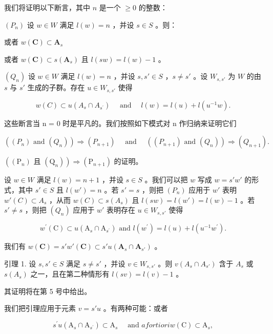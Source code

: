 我们将证明以下断言，其中 \(n\) 是一个 \(\geqslant 0\) 的整数：

\((P_n)\) 设 \(w \in W\) 满足 \(l(w) = n\) ，并设 \(s \in S\) 。则：

或者 \(w(\mathbf{C})\subset \mathbf{A}_s\)

或者 \(w(\mathbf{C}) \subset s(\mathbf{A}_s)\) 且 \(l(sw) = l(w) - 1\) 。

\((Q_n)\) 设 \(w \in W\) 满足 \(l(w) = n\) ，并设 \(s, s' \in S\) ，\(s \neq s'\) 。设 \(W_{s,s'}\) 为 \(W\) 的由 \(s\) 与 \(s'\) 生成的子群。存在 \(u \in W_{s,s'}\) 使得

\[
w (C) \subset u \left(A _ {s} \cap A _ {s ^ {\prime}}\right) \quad \text { and } \quad l (w) = l (u) + l \left(u ^ {- 1} w\right).
\]

这些断言当 n = 0 时是平凡的。我们按照如下模式对 n 作归纳来证明它们

\[
\left(\left(P _ {n}\right) \text {   and   } \left(Q _ {n}\right)\right) \Longrightarrow \left(P _ {n + 1}\right) \quad \text { and } \quad \left(\left(P _ {n + 1}\right) \text {   and   } \left(Q _ {n}\right)\right) \Longrightarrow \left(Q _ {n + 1}\right).
\]

\(\left((\mathrm{P}_n)\text{ 且 } (\mathrm{Q}_n)\right) \Longrightarrow (\mathrm{P}_{n+1})\) 的证明。

设 \(w \in W\) 满足 \(l(w) = n + 1\) ，并设 \(s \in S\) 。我们可以把 \(w\) 写成 \(w = s'w'\) 的形式，其中 \(s' \in S\) 且 \(l(w') = n\) 。若 \(s' = s\) ，则把 \((P_n)\) 应用于 \(w'\) 表明 \(w'(C) \subset A_s\) ，从而 \(w(C) \subset s(A_s)\) 且 \(l(sw) = l(w') = l(w) - 1\) 。若 \(s' \neq s\) ，则把 \((Q_n)\) 应用于 \(w'\) 表明存在 \(u \in W_{s,s'}\) 使得

\[
w ^ {\prime} (\mathrm{C}) \subset u \left(\mathrm{A} _ {s} \cap \mathrm{A} _ {s ^ {\prime}}\right) \text { and } l \left(w ^ {\prime}\right) = l (u) + l \left(u ^ {- 1} w ^ {\prime}\right).
\]

我们有 \(w(\mathbf{C}) = s'w'(\mathbf{C}) \subset s'u(\mathbf{A}_s \cap \mathbf{A}_{s'})\) 。

引理 1. 设 \(s, s' \in S\) 满足 \(s \neq s'\) ，并设 \(v \in W_{s,s'}\) 。则 \(v(A_s \cap A_{s'})\) 含于 \(A_s\) 或 \(s(A_s)\) 之一，且在第二种情形有 \(l(sv) = l(v) - 1\) 。

其证明将在第 5 号中给出。

我们把引理应用于元素 \(v = s'u\) 。有两种可能：或者

\[
  s ^ {\prime} u \left(\mathrm{A} _ {s} \cap \mathrm{A} _ {s ^ {\prime}}\right) \subset \mathrm{A} _ {s} \quad \text { and } a fortiori w (\mathrm{C}) \subset \mathrm{A} _ {s},
\]


